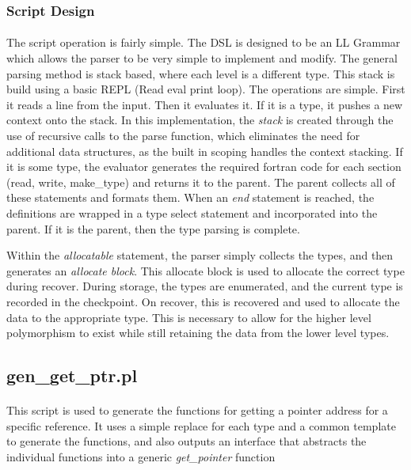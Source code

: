 \documentclass{article}
\begin{document}
\subsubsection{Script Design}
\paragraph{}
The script operation is fairly simple. The DSL is designed to be an LL Grammar which allows the parser to be very simple to implement and modify. The general parsing method is stack based, where each level is a different type. This stack is build using a basic REPL (Read eval print loop). The operations are simple. First it reads a line from the input. Then it evaluates it. If it is a type, it pushes a new context onto the stack. In this implementation, the \emph{stack} is created through the use of recursive calls to the parse function, which eliminates the need for additional data structures, as the built in scoping handles the context stacking. If it is some type, the evaluator generates the required fortran code for each section (read, write, make\_type) and returns it to the parent. The parent collects all of these statements and formats them. When an \emph{end} statement is reached, the definitions are wrapped in a type select statement and incorporated into the parent. If it is the parent, then the type parsing is complete.

Within the \emph{allocatable} statement, the parser simply collects the types, and then generates an \emph{allocate block}. This allocate block is used to allocate the correct type during recover. During storage, the types are enumerated, and the current type is recorded in the checkpoint. On recover, this is recovered and used to allocate the data to the appropriate type. This is necessary to allow for the higher level polymorphism to exist while still retaining the data from the lower level types.

\subsection{gen\_get\_ptr.pl}
\paragraph{}
This script is used to generate the functions for getting a pointer address for a specific reference. It uses a simple replace for each type and a common template to generate the functions, and also outputs an interface that abstracts the individual functions into a generic \emph{get\_pointer} function
\end{document}
